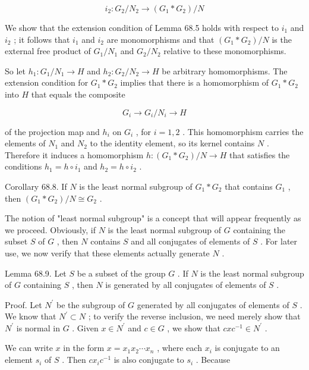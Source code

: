 \documentclass[10pt]{article}
\begin{document}
\[
{i}_{2} : {G}_{2}/{N}_{2} \rightarrow  \left( {{G}_{1} * {G}_{2}}\right) /N
\]

We show that the extension condition of Lemma 68.5 holds with respect to \({i}_{1}\) and \({i}_{2}\) ; it follows that \({i}_{1}\) and \({i}_{2}\) are monomorphisms and that \(\left( {{G}_{1} * {G}_{2}}\right) /N\) is the external free product of \({G}_{1}/{N}_{1}\) and \({G}_{2}/{N}_{2}\) relative to these monomorphisms.

So let \({h}_{1} : {G}_{1}/{N}_{1} \rightarrow  H\) and \({h}_{2} : {G}_{2}/{N}_{2} \rightarrow  H\) be arbitrary homomorphisms. The extension condition for \({G}_{1} * {G}_{2}\) implies that there is a homomorphism of \({G}_{1} * {G}_{2}\) into \(H\) that equals the composite

\[
{G}_{i} \rightarrow  {G}_{i}/{N}_{i} \rightarrow  H
\]

of the projection map and \({h}_{i}\) on \({G}_{i}\) , for \(i = 1,2\) . This homomorphism carries the elements of \({N}_{1}\) and \({N}_{2}\) to the identity element, so its kernel contains \(N\) . Therefore it induces a homomorphism \(h : \left( {{G}_{1} * {G}_{2}}\right) /N \rightarrow  H\) that satisfies the conditions \({h}_{1} = h \circ  {i}_{1}\) and \({h}_{2} = h \circ  {i}_{2}\) .

Corollary 68.8. If \(N\) is the least normal subgroup of \({G}_{1} * {G}_{2}\) that contains \({G}_{1}\) , then \(\left( {{G}_{1} * {G}_{2}}\right) /N \cong  {G}_{2}\) .

The notion of "least normal subgroup" is a concept that will appear frequently as we proceed. Obviously, if \(N\) is the least normal subgroup of \(G\) containing the subset \(S\) of \(G\) , then \(N\) contains \(S\) and all conjugates of elements of \(S\) . For later use, we now verify that these elements actually generate \(N\) .

Lemma 68.9. Let \(S\) be a subset of the group \(G\) . If \(N\) is the least normal subgroup of \(G\) containing \(S\) , then \(N\) is generated by all conjugates of elements of \(S\) .

Proof. Let \({N}^{\prime }\) be the subgroup of \(G\) generated by all conjugates of elements of \(S\) . We know that \({N}^{\prime } \subset  N\) ; to verify the reverse inclusion, we need merely show that \({N}^{\prime }\) is normal in \(G\) . Given \(x \in  {N}^{\prime }\) and \(c \in  G\) , we show that \({cx}{c}^{-1} \in  {N}^{\prime }\) .

We can write \(x\) in the form \(x = {x}_{1}{x}_{2}\cdots {x}_{n}\) , where each \({x}_{i}\) is conjugate to an element \({s}_{i}\) of \(S\) . Then \(c{x}_{i}{c}^{-1}\) is also conjugate to \({s}_{i}\) . Because
\end{document}
